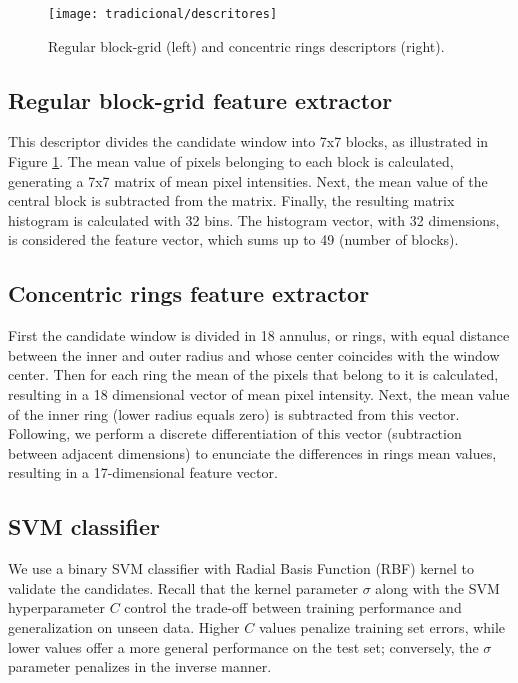     \begin{figure}
    \centering
    \texttt{[image: tradicional/descritores]}
    \caption{Regular block-grid (left) and concentric rings descriptors (right).}
    \label{fig:descriptors}
    \end{figure}

    \subsection{Regular block-grid feature extractor}
      This descriptor divides the candidate window into 7x7 blocks, as illustrated in Figure \ref{fig:descriptors}. The mean value of pixels belonging to each block is calculated, generating a 7x7 matrix of mean pixel intensities. Next, the mean value of the central block is subtracted from the matrix. Finally, the resulting matrix histogram is calculated with 32 bins. The histogram vector, with 32 dimensions, is considered the feature vector, which sums up to 49 (number of blocks).

    \subsection{Concentric rings feature extractor}
       First the candidate window is divided in 18 annulus, or rings, with equal distance between the inner and outer radius and whose center coincides with the window center. Then for each ring the mean of the pixels that belong to it is calculated, resulting in a 18 dimensional vector of mean pixel intensity. Next, the mean value of the inner ring (lower radius equals zero) is subtracted from this vector. Following, we perform a discrete differentiation of this vector (subtraction between adjacent dimensions) to enunciate the differences in rings mean values, resulting in a 17-dimensional feature vector.

    \subsection{SVM classifier}
      We use a binary SVM classifier with Radial Basis Function (RBF) kernel \cite{rbfkernel} to validate the candidates. Recall that the kernel parameter $\sigma$ along with the SVM hyperparameter $C$ control the trade-off between training performance and generalization on unseen data. Higher $C$ values penalize training set errors, while lower values offer a more general performance on the test set; conversely, the $\sigma$ parameter penalizes in the inverse manner.

